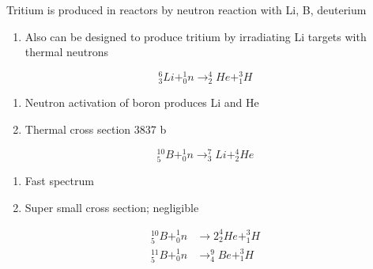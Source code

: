 \documentclass[aspectratio=1610,pdftex,dvipsnames,compress,xcolor={dvipsnames}]{beamer}
\begin{document}
\addtocounter{framenumber}{-1} 
\begin{frame}{Tritium is produced in reactors by neutron reaction with Li, B, deuterium}
    \begin{enumerate}[series=outerlist,topsep=0pt,itemsep=7pt,leftmargin=*,label=(\arabic*)]
        \item[]Also can be designed to produce tritium by irradiating Li targets with thermal neutrons
    \end{enumerate}
    
    \vspace*{\fill}

    \begin{equation*}
        ^6_3Li+^1_0n \rightarrow ^4_2He+^3_1H
    \end{equation*}
    
    \vspace*{\fill}

    \begin{enumerate}[series=outerlist,topsep=0pt,itemsep=7pt,leftmargin=*,label=(\arabic*)]
        \item[]Neutron activation of boron produces Li and He
        \item[]Thermal cross section 3837 b
    \end{enumerate}
    
    \vspace*{\fill}

    \begin{equation*}
        ^{10}_5B+^1_0n \rightarrow ^7_3Li+^4_2He
    \end{equation*}
    
    \vspace*{\fill}

    \begin{enumerate}[series=outerlist,topsep=0pt,itemsep=7pt,leftmargin=*,label=(\arabic*)]
        \item[]Fast spectrum
        \item[]Super small cross section; negligible
    \end{enumerate}
    
    \vspace*{\fill}

    \begin{equation*}
        \begin{aligned}
            ^{10}_5B+^1_0n & \rightarrow 2 ^4_2He+^3_1H
            \\
            ^{11}_5B+^1_0n & \rightarrow ^9_4Be+^3_1H
        \end{aligned}
    \end{equation*}
\end{frame}
\end{document}

